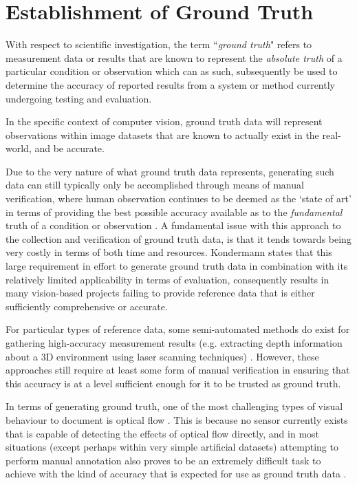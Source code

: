 \section{Establishment of Ground Truth}

With respect to scientific investigation, the term ``\textit{ground truth}" refers to measurement data or results that are known to represent the \textit{absolute truth} of a particular condition or observation which can as such, subsequently be used to determine the accuracy of reported results from a system or method currently undergoing testing and evaluation.

In the specific context of computer vision, ground truth data will represent observations within image datasets that are known to actually exist in the real-world, and be accurate.

Due to the very nature of what ground truth data represents, generating such data can still typically only be accomplished through means of manual verification, where human observation continues to be deemed as the `state of art' in terms of providing the best possible accuracy available as to the \textit{fundamental} truth of a condition or observation \cite{kondermann}. A fundamental issue with this approach to the collection and verification of ground truth data, is that it tends towards being very costly in terms of both time and resources. Kondermann \cite{kondermann} states that this large requirement in effort to generate ground truth data in combination with its relatively limited applicability in terms of evaluation, consequently results in many vision-based projects failing to provide reference data that is either sufficiently comprehensive or accurate.

For particular types of reference data, some semi-automated methods do exist for gathering high-accuracy measurement results (e.g. extracting depth information about a 3D environment using laser scanning techniques) \cite{haltakov}. However, these approaches still require at least some form of manual verification in ensuring that this accuracy is at a level sufficient enough for it to be trusted as ground truth.

In terms of generating ground truth, one of the most challenging types of visual behaviour to document is optical flow \cite{kondermann}. This is because no sensor currently exists that is capable of detecting the effects of optical flow directly, and in most situations (except perhaps within very simple artificial datasets) attempting to perform manual annotation also proves to be an extremely difficult task to achieve with the kind of accuracy that is expected for use as ground truth data \cite{haltakov}. 

